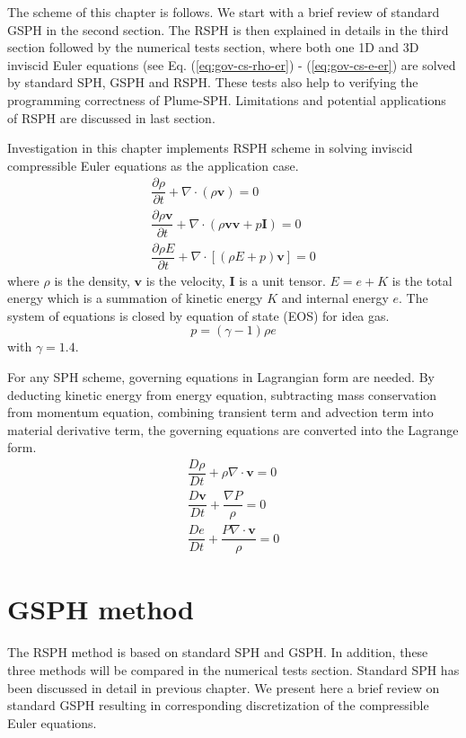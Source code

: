 The scheme of this chapter is follows. We start with a brief review of standard GSPH in the second section. The RSPH is then explained in details in the third section followed by the numerical tests section, where both one 1D and 3D inviscid Euler equations (see Eq. (\ref{eq:gov-cs-rho-er}) - (\ref{eq:gov-cs-e-er}) are solved by standard SPH, GSPH and RSPH. These tests also help to verifying the programming correctness of Plume-SPH. Limitations and potential applications of RSPH are discussed in last section. 

Investigation in this chapter implements RSPH scheme in solving inviscid compressible Euler equations as the application case.  
\begin{align}
\dfrac{\partial \rho}{\partial t} + \nabla \cdot \left(\rho \textbf{v} \right) = 0 \label{eq:gov-cs-rho-er} \\
\dfrac{\partial \rho \textbf{v}}{\partial t} + \nabla \cdot \left(\rho \textbf{v} \textbf{v} + p\textbf{I}\right) = 0 \label{eq:gov-cs-v-er} \\
\dfrac{\partial \rho E}{\partial t} + \nabla \cdot \left[\left(\rho E + p \right)\textbf{v}\right] = 0 \label{eq:gov-cs-e-er}
\end{align}
where $\rho$ is the density, $\textbf{v}$ is the velocity, $\textbf{I}$ is a unit tensor.
$E = e + K $ is the total energy which is a summation of kinetic energy $K$ and internal energy $e$.
The system of equations is closed by equation of state (EOS) for idea gas.
\begin{equation}
p = \left(\gamma - 1\right)\rho e \label{eq:EOS-er}
\end{equation}
with $\gamma=1.4$.

For any SPH scheme, governing equations in Lagrangian form are needed. By deducting kinetic energy from energy equation, subtracting mass conservation from momentum equation, combining transient term and advection term into material derivative term, the governing equations are converted into the Lagrange form. 
\begin{align}
\dfrac{D \rho}{D t} + \rho \nabla \cdot \textbf{v} = 0 \label{eq:gov-nc-rho-er}\\
\dfrac{D \textbf{v}}{D t} + \dfrac{\nabla P}{\rho} =0 \label{eq:gov-nc-v-er}\\
\dfrac{D e}{D t} + \dfrac{P \nabla \cdot \textbf{v}}{\rho} = 0 \label{eq:gov-nc-e-er}
\end{align}

\section{GSPH method} \label{sec:GSPH-method}
The RSPH method is based on standard SPH and GSPH. In addition, these three methods will be compared in the numerical tests section. Standard SPH has been discussed in detail in previous chapter. We present here a brief review on standard GSPH resulting in corresponding discretization of the compressible Euler equations.
 

